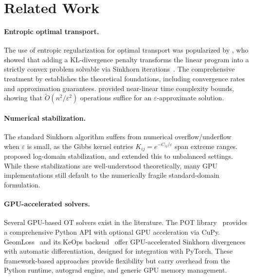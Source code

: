 
\section{Related Work}
\label{sec:related_work}

\paragraph{Entropic optimal transport.}
The use of entropic regularization for optimal transport was popularized by \citet{cuturi2013sinkhorn}, who showed that adding a KL-divergence penalty transforms the linear program into a strictly convex problem solvable via Sinkhorn iterations~\citep{sinkhorn1967diagonal}. The comprehensive treatment by \citet{peyre2019computational} establishes the theoretical foundations, including convergence rates and approximation guarantees. \citet{altschuler2017near} provided near-linear time complexity bounds, showing that $\tilde{O}(n^2/\varepsilon^2)$ operations suffice for an $\varepsilon$-approximate solution.

\paragraph{Numerical stabilization.}
The standard Sinkhorn algorithm suffers from numerical overflow/underflow when $\varepsilon$ is small, as the Gibbs kernel entries $K_{ij} = e^{-C_{ij}/\varepsilon}$ span extreme ranges. \citet{schmitzer2019stabilized} proposed log-domain stabilization, and \citet{chizat2018scaling} extended this to unbalanced settings. While these stabilizations are well-understood theoretically, many GPU implementations still default to the numerically fragile standard-domain formulation.

\paragraph{GPU-accelerated solvers.}
Several GPU-based OT solvers exist in the literature. The POT library~\citep{flamary2021pot} provides a comprehensive Python API with optional GPU acceleration via CuPy. GeomLoss~\citep{feydy2019interpolating} and its KeOps backend~\citep{charlier2021kernel} offer GPU-accelerated Sinkhorn divergences with automatic differentiation, designed for integration with PyTorch. These framework-based approaches provide flexibility but carry overhead from the Python runtime, autograd engine, and generic GPU memory management.

